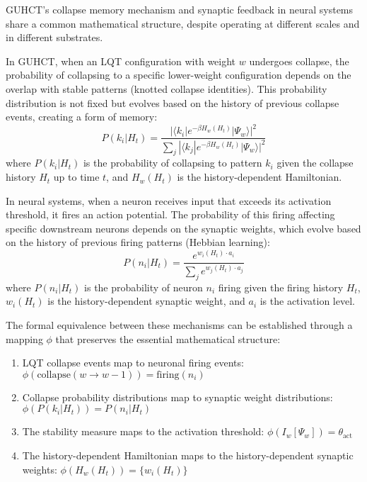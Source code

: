 \documentclass[11pt,a4paper]{article}
\makeatletter
\renewenvironment{proof}[1][\proofname]{\par
  \pushQED{\qed}%
  \normalfont \topsep6\p@\@plus6\p@\relax
  \trivlist
  \item[\hskip\labelsep
        \itshape
    #1\@addpunct{.}]\ignorespaces
}{%
  \popQED\endtrivlist\@endpefalse
}
\makeatother
\begin{document}
\begin{proof}
GUHCT's collapse memory mechanism and synaptic feedback in neural systems share a common mathematical structure, despite operating at different scales and in different substrates.

In GUHCT, when an LQT configuration with weight $w$ undergoes collapse, the probability of collapsing to a specific lower-weight configuration depends on the overlap with stable patterns (knotted collapse identities). This probability distribution is not fixed but evolves based on the history of previous collapse events, creating a form of memory:
\begin{equation}
P(k_i|H_t) = \frac{|\langle k_i|e^{-\beta H_w(H_t)}|\Psi_w\rangle|^2}{\sum_j |\langle k_j|e^{-\beta H_w(H_t)}|\Psi_w\rangle|^2}
\end{equation}
where $P(k_i|H_t)$ is the probability of collapsing to pattern $k_i$ given the collapse history $H_t$ up to time $t$, and $H_w(H_t)$ is the history-dependent Hamiltonian.

In neural systems, when a neuron receives input that exceeds its activation threshold, it fires an action potential. The probability of this firing affecting specific downstream neurons depends on the synaptic weights, which evolve based on the history of previous firing patterns (Hebbian learning):
\begin{equation}
P(n_i|H_t) = \frac{e^{w_i(H_t) \cdot a_i}}{\sum_j e^{w_j(H_t) \cdot a_j}}
\end{equation}
where $P(n_i|H_t)$ is the probability of neuron $n_i$ firing given the firing history $H_t$, $w_i(H_t)$ is the history-dependent synaptic weight, and $a_i$ is the activation level.

The formal equivalence between these mechanisms can be established through a mapping $\phi$ that preserves the essential mathematical structure:
\begin{enumerate}
    \item LQT collapse events map to neuronal firing events: $\phi(\text{collapse}(w \to w-1)) = \text{firing}(n_i)$
    \item Collapse probability distributions map to synaptic weight distributions: $\phi(P(k_i|H_t)) = P(n_i|H_t)$
    \item The stability measure maps to the activation threshold: $\phi(I_w[\Psi_w]) = \theta_{\text{act}}$
    \item The history-dependent Hamiltonian maps to the history-dependent synaptic weights: $\phi(H_w(H_t)) = \{w_i(H_t)\}$
\end{enumerate}


\end{proof}
\end{document}
